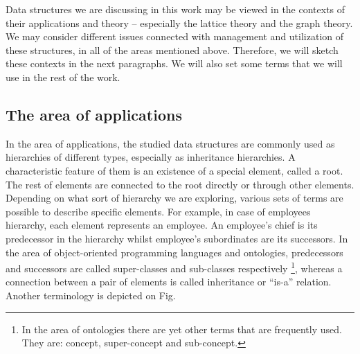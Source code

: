 Data structures we are discussing in this work may be viewed in the contexts of their applications and theory --
especially the lattice theory and the graph theory. We may consider different issues connected with management and
utilization of these structures, in all of the areas mentioned above. Therefore, we will sketch these contexts in the
next paragraphs. We will also set some terms that we will use in the rest of the work.

\subsection{The area of applications}
In the area of applications, the studied data structures are commonly used as hierarchies of different types, especially
as inheritance hierarchies. A characteristic feature of them is an existence of a special element, called a root. The
rest of elements are connected to the root directly or through other elements. Depending on what sort of hierarchy we
are exploring, various sets of terms are possible to describe specific elements. For example, in case of employees
hierarchy, each element represents an employee. An employee's chief is its predecessor in the hierarchy whilst
employee's subordinates are its successors. In the area of object-oriented programming languages and ontologies,
predecessors and successors are called super-classes and sub-classes respectively \footnote{In the area of ontologies
there are yet other terms that are frequently used. They are: concept, super-concept and sub-concept.}, whereas a
connection between a pair of elements is called inheritance or ``is-a'' relation. Another terminology is  depicted on
Fig. 